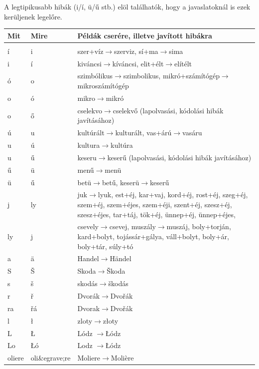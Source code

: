 A legtipikusabb hibák (i/í, ü/ű stb.) elöl találhatók,
hogy a javaslatoknál is ezek kerüljenek legelőre.

\begin{longtable}[l]{llp{10cm}}
\hline Mit & Mire & Példák cserére, illetve javított hibákra
\\ \hline \endhead
\hline \endfoot
\\ \hline í & i & szer+víz$\rightarrow$szerviz, sí+ma$\rightarrow$sima
\\ \hline i & í & kiváncsi$\rightarrow$kíváncsi, elit+élt$\rightarrow$elítélt
\\ \hline ó & o & szimbólikus$\rightarrow$szimbolikus, mikró+számítógép$\rightarrow$mikroszámítógép
\\ \hline o & ó & mikro$\rightarrow$mikró
\\ \hline o & ő & cselekvo$\rightarrow$cselekvő (lapolvasási, kódolási hibák javításához)
\\ \hline ú & u & kultúrált$\rightarrow$kulturált, vas+árú$\rightarrow$vasáru
\\ \hline u & ú & kultura$\rightarrow$kultúra
\\ \hline u & ű & keseru$\rightarrow$keserű (lapolvasási, kódolási hibák javításához)
\\ \hline ű & ü & menű$\rightarrow$menü
\\ \hline ü & ű & betü$\rightarrow$betű, keserü$\rightarrow$keserű
\\ \hline j & ly & juk$\rightarrow$lyuk, est+éj, kar+vaj, kord+éj, rost+éj,
szeg+éj, szem+éj, szem+éjes, szem+éji, szent+éj, szesz+éj, szesz+éjes,
tar+táj, tök+éj, ünnep+éj, ünnep+éjes,
\\ \hline ly & j & csevely$\rightarrow$csevej, muszály$\rightarrow$muszáj, boly+torján,
kard+bolyt, tojássár+gálya, váll+bolyt, boly+ár, boly+tár, súly+tó
\\ \hline a& ä & Handel$\rightarrow$Händel
\\ \hline S& Š & Skoda$\rightarrow$Škoda
\\ \hline s& š & skodás$\rightarrow$škodás
\\ \hline r& ř & Dvorák$\rightarrow$Dvořák
\\ \hline ra& řá & Dvorak$\rightarrow$Dvořák
\\ \hline l& ł & zloty$\rightarrow$złoty
\\ \hline L& Ł & Lódz $\rightarrow$Łódz
\\ \hline Lo & Łó & Lodz $\rightarrow$Łódz
\\ \hline oliere & oli\&egrave;re & Moliere$\rightarrow$Moli\`ere

\end{longtable}
